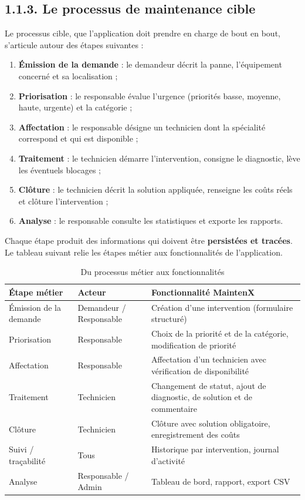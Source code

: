 \documentclass[11pt,a4paper]{report}
\begin{document}
\subsection*{1.1.3. Le processus de maintenance cible}

Le processus cible, que l'application doit prendre en charge de bout en bout, s'articule autour des étapes suivantes :
\begin{enumerate}
  \item \textbf{Émission de la demande} : le demandeur décrit la panne, l'équipement concerné et sa localisation ;
  \item \textbf{Priorisation} : le responsable évalue l'urgence (priorités basse, moyenne, haute, urgente) et la catégorie ;
  \item \textbf{Affectation} : le responsable désigne un technicien dont la spécialité correspond et qui est disponible ;
  \item \textbf{Traitement} : le technicien démarre l'intervention, consigne le diagnostic, lève les éventuels blocages ;
  \item \textbf{Clôture} : le technicien décrit la solution appliquée, renseigne les coûts réels et clôture l'intervention ;
  \item \textbf{Analyse} : le responsable consulte les statistiques et exporte les rapports.
\end{enumerate}

Chaque étape produit des informations qui doivent être \textbf{persistées et tracées}. Le tableau suivant relie les étapes métier aux fonctionnalités de l'application.
\begin{table}[htbp]\centering\small
\begin{tabularx}{\textwidth}{|X|X|X|}
\hline\rowcolor{hdr}\textbf{Étape métier} & \textbf{Acteur} & \textbf{Fonctionnalité MaintenX}\\ \hline
Émission de la demande & Demandeur / Responsable & Création d'une intervention (formulaire structuré)\\ \hline
Priorisation & Responsable & Choix de la priorité et de la catégorie, modification de priorité\\ \hline
Affectation & Responsable & Affectation d'un technicien avec vérification de disponibilité\\ \hline
Traitement & Technicien & Changement de statut, ajout de diagnostic, de solution et de commentaire\\ \hline
Clôture & Technicien & Clôture avec solution obligatoire, enregistrement des coûts\\ \hline
Suivi / traçabilité & Tous & Historique par intervention, journal d'activité\\ \hline
Analyse & Responsable / Admin & Tableau de bord, rapport, export CSV\\ \hline
\end{tabularx}
\caption{Du processus métier aux fonctionnalités}
\end{table}
\end{document}
